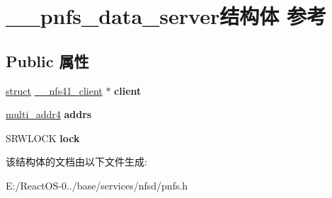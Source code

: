\hypertarget{struct____pnfs__data__server}{}\section{\+\_\+\+\_\+pnfs\+\_\+data\+\_\+server结构体 参考}
\label{struct____pnfs__data__server}
\subsection*{Public 属性}
\begin{DoxyCompactItemize}
\item 
\mbox{\label{struct____pnfs__data__server_ad10c1555e6bb3cc8449178226700110c}} 
\hyperlink{interfacestruct}{struct} \hyperlink{struct____nfs41__client}{\+\_\+\+\_\+nfs41\+\_\+client} $\ast$ {\bfseries client}
\item 
\mbox{\label{struct____pnfs__data__server_a4566fa6230293ad63faf46fb45666c30}} 
\hyperlink{struct____multi__addr4}{multi\+\_\+addr4} {\bfseries addrs}
\item 
\mbox{\label{struct____pnfs__data__server_a19b2d5c8cc06054e46696239e6eca138}} 
S\+R\+W\+L\+O\+CK {\bfseries lock}
\end{DoxyCompactItemize}


该结构体的文档由以下文件生成\+:\begin{DoxyCompactItemize}
\item 
E\+:/\+React\+O\+S-\/0../base/services/nfsd/pnfs.\+h\end{DoxyCompactItemize}
